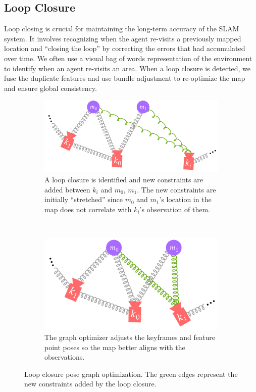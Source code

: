 \subsection{Loop Closure}
\label{sec:visual-slam-loop-closure}
Loop closing is crucial for maintaining the long-term accuracy of the SLAM system. It involves recognizing when the agent re-visits a previously mapped location and ``closing the loop'' by correcting the errors that had accumulated over time. We often use a visual bag of words representation of the environment to identify when an agent re-visits an area. When a loop closure is detected, we fuse the duplicate features and use bundle adjustment to re-optimize the map and ensure global consistency.

\begin{figure}[h]
    \centering
    \begin{subfigure}[t]{0.54\textwidth}
        \centering
        \includegraphics[width=\textwidth]{figures/gpo_loop_closure_1.pdf}
        \caption{A loop closure is identified and new constraints are added between $k_i$ and $m_0$, $m_1$. The new constraints are initially ``stretched'' since $m_0$ and $m_1$'s location in the map does not correlate with $k_i$'s observation of them.}
    \end{subfigure}\hfill%
    ~
    \begin{subfigure}[t]{0.43\textwidth}
        \centering
        \includegraphics[width=\textwidth]{figures/gpo_loop_closure_2.pdf}
        \caption{The graph optimizer adjusts the keyframes and feature point poses so the map better aligns with the observations.}
    \end{subfigure}%
    \caption{Loop closure pose graph optimization. The green edges represent the new constraints added by the loop closure.}
    \label{fig:gpo-loop-closure}
\end{figure}

